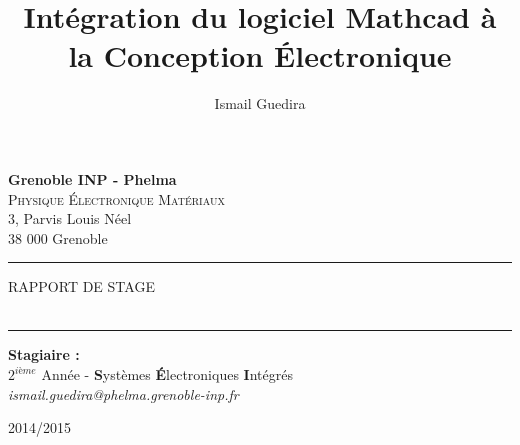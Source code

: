 \documentclass[11pt,a4paper]{report}
\title{Intégration du logiciel Mathcad à la Conception Électronique}
\author{Ismail Guedira}
\begin{document}

\makeatletter
  \begin{titlepage}
  \centering
      {%
    \hfill \Large \textbf{Grenoble INP - Phelma}}\\
    \hfill \large \textsc{Physique Électronique Matériaux}\\
    \hfill  3, Parvis Louis Néel \\
	   \hfill  38 000 Grenoble\\

	\hspace{3em}



   \vfill

    \hrule
    \vspace{1.5em}
    	{	\LARGE \textsc{RAPPORT DE STAGE} \\
    \vspace{1.5em}
       \LARGE \textbf{\@title}} \\
    \vspace{1.5em}
    \hrule
    \vspace{3 em}
	\Large \textbf{Stagiaire :}		\hfill   \textsc{\@author} \\
                                  	\hfill   \large $2^{ième}$ Année - \textbf{S}ystèmes \textbf{É}lectroniques \textbf{I}ntégrés \\
   									\hfill   \textit{ismail.guedira@phelma.grenoble-inp.fr} \\
	\vspace{2em}



    \vfill

     {\Large \textsc{2014/2015}  \hfill \Large \textsc{\@date}} \\


  \end{titlepage}
\makeatother
\end{document}
